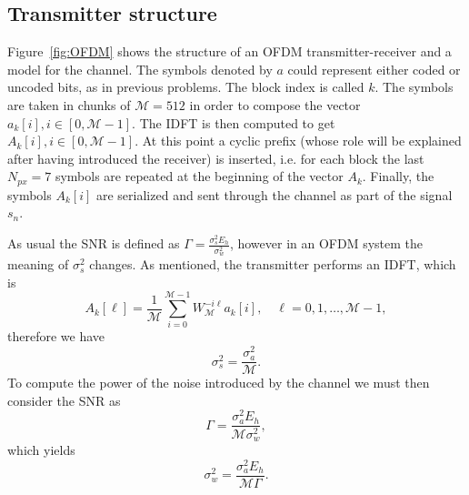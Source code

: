 \documentclass[10pt]{article}
\newcommand{\ofdM} {\mathcal{M}}
\begin{document}
\subsection*{Transmitter structure}
Figure~\ref{fig:OFDM} shows the structure of an OFDM transmitter-receiver and a model for the channel. The symbols denoted by $a$ could represent either coded or uncoded bits, as in previous problems. The block index is called $k$. The symbols are taken in chunks of $\ofdM = 512$ in order to compose the vector $a_k[i], i \in [0, \ofdM - 1]$. The IDFT is then computed to get $A_k[i], i\in [0, \ofdM-1]$. At this point a cyclic prefix (whose role will be explained after having introduced the receiver) is inserted, i.e. for each block the last $N_{px} = 7$ symbols are repeated at the beginning of the vector $A_k$. Finally, the symbols $A_k[i]$ are serialized and sent through the channel as part of the signal $s_n$.

As usual the SNR is defined as $\Gamma = \frac{\sigma_s^2 E_h}{\sigma_w^2}$, however in an OFDM system the meaning of $\sigma_s^2$ changes. As mentioned, the transmitter performs an IDFT, which is
\begin{equation}
	A_k[\ell] = \frac{1}{\ofdM} \sum_{i = 0}^{\ofdM - 1} W_{\ofdM}^{-i\ell} a_k[i], \quad \ell = 0, 1, \dots, \ofdM-1,
\end{equation}
therefore we have 
\begin{equation}
	\sigma_s^2 = \dfrac{\sigma_a^2}{\ofdM}.
\end{equation}
To compute the power of the noise introduced by the channel we must then consider the SNR as
\begin{equation}
	\Gamma = \dfrac{\sigma_a^2 E_h}{\ofdM \sigma_w^2},
	\label{eq:snrOFDM}
\end{equation}
which yields
\begin{equation}
	\sigma_w^2 = \dfrac{\sigma_a^2 E_h}{\ofdM \Gamma}.
\end{equation}
\end{document}

